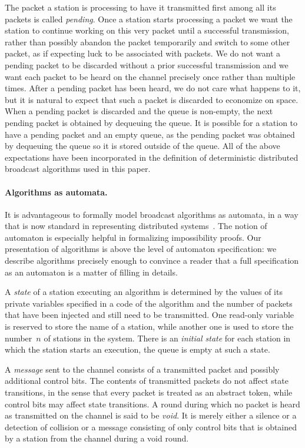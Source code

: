 \documentclass[11pt]{article}
\newcommand{\BBB}{\vspace*{-\bigskipamount}}
\newcommand{\Paragraph}[1]{\BBB\paragraph{#1}}
\begin{document}
The  packet a station is processing to have it transmitted first among all its packets is called \emph{pending}.
Once a station starts processing a packet we want the station to continue working on this very packet until a successful transmission, rather than possibly abandon the packet temporarily and switch to some other packet, as if expecting luck to be associated with packets.
We do not want a pending packet to be discarded without a prior successful transmission and we want each packet to be heard on the channel precisely once rather than multiple times.
After a pending packet has been heard, we do not care what happens to it, but it is natural to expect that such a packet is discarded to economize on space.
When a pending packet is discarded and the queue is non-empty, the next pending packet is obtained by dequeuing the queue.
It is possible for a station to have a pending packet and an empty queue, as the pending packet was obtained by dequeuing the queue so it is stored outside of the queue.
All of the above expectations have been incorporated in the definition of deterministic distributed broadcast algorithms used in this paper.





\Paragraph{Algorithms as automata.}



It is advantageous to formally model broadcast algorithms as automata, in a way that is now standard in representing distributed systems~\cite{Lynch-book96}.
The notion of automaton is especially helpful in formalizing impossibility proofs.
Our presentation of algorithms is above the level of automaton specification: we describe algorithms precisely enough to convince a reader that a full specification as an automaton is a matter of filling in details.
 
A \emph{state} of a station executing an algorithm is determined by the values of its private variables specified in a code of the algorithm and the number of packets that have been injected and still need to be transmitted.
One read-only variable is reserved to store the name of a station, while another one is used to store the number~$n$ of stations in the system.
There is an \emph{initial state} for each station in which the station starts an execution, the queue is empty at such a state.

A \emph{message} sent to the channel consists of a transmitted packet and possibly additional control bits.
The contents of transmitted packets do not affect state transitions, in the sense that every packet is treated as an abstract token, while control bits may affect state transitions.
A round during which no packet is heard as transmitted on the channel is said to be \emph{void}.
It is merely either a silence or a detection of collision or a message consisting of only control bits that is obtained by a station from the channel during a void round.
\end{document}
